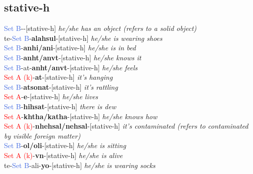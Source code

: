 \documentclass[oneside,openany]{book}%
\begin{document}
\subsection*{stative-h}%
\textcolor{RoyalBlue}{Set B}{-}\textbf{}{-}[stative-h] \textit{ he/she has an object (refers to a solid object)} \\%
te{-}\textcolor{RoyalBlue}{Set B}{-}\textbf{alahsul}{-}[stative-h] \textit{ he/she is wearing shoes} \\%
\textcolor{RoyalBlue}{Set B}{-}\textbf{anhi/ani}{-}[stative-h] \textit{ he/she is in bed} \\%
\textcolor{RoyalBlue}{Set B}{-}\textbf{anht/anvt}{-}[stative-h] \textit{ he/she knows it} \\%
\textcolor{RoyalBlue}{Set B}{-}at{-}\textbf{anht/anvt}{-}[stative-h] \textit{ he/she feels} \\%
\textcolor{Red}{Set A (k)}{-}\textbf{at}{-}[stative-h] \textit{ it's hanging} \\%
\textcolor{RoyalBlue}{Set B}{-}\textbf{atsonat}{-}[stative-h] \textit{ it's rattling} \\%
\textcolor{Red}{Set A}{-}\textbf{e}{-}[stative-h] \textit{ he/she lives} \\%
\textcolor{RoyalBlue}{Set B}{-}\textbf{hihsat}{-}[stative-h] \textit{ there is dew} \\%
\textcolor{Red}{Set A}{-}\textbf{khtha/katha}{-}[stative-h] \textit{ he/she knows how} \\%
\textcolor{Red}{Set A (k)}{-}\textbf{nhehsal/nehsal}{-}[stative-h] \textit{ it's contaminated (refers to contaminated by visible foreign matter)} \\%
\textcolor{RoyalBlue}{Set B}{-}\textbf{ol/oli}{-}[stative-h] \textit{ he/she is sitting} \\%
\textcolor{Red}{Set A (k)}{-}\textbf{vn}{-}[stative-h] \textit{ he/she is alive} \\%
te{-}\textcolor{RoyalBlue}{Set B}{-}ali{-}\textbf{yo}{-}[stative-h] \textit{ he/she is wearing socks} \\%
\vspace{1em}%
\needspace{1in}%
\end{document}
